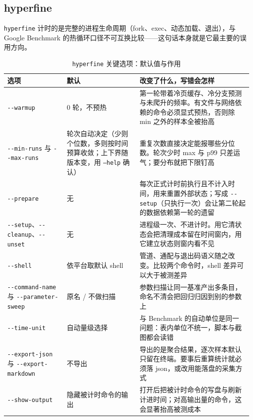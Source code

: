 \documentclass[12pt,a4paper,fontset=fandol]{ctexbook}
\newcommand{\Tp}[1]{\texttt{#1}}
\newcommand{\Opt}[1]{\texttt{-\/-#1}}
\newcommand{\Bk}{\discretionary{}{}{}}
\newcommand{\Mx}[1]{\textsf{#1}}
\begin{document}
\subsection{hyperfine}
\label{sub:pmapB-hyperfine}

\Tp{hyperfine} 计时的是完整的进程生命周期（fork、exec、动态加载、退出），与 Google Benchmark 的热循环口径不可互换比较——这句话本身就是它最主要的误用方向。

\begin{table}[htbp]
\centering
\small
\begin{tabularx}{\textwidth}{>{\raggedright\arraybackslash}p{} >{\raggedright\arraybackslash}p{} >{\raggedright\arraybackslash}X}
\toprule
选项 & 默认 & 改变了什么，写错会怎样 \\
\midrule
\Opt{warmup} & $0$ 轮，不预热 & 第一轮带着冷页缓存、冷分支预测与未爬升的频率。有文件与网络依赖的命令必须显式预热，否则除 \Mx{min} 之外的样本全被抬高 \\
\Opt{min-runs} 与 \Opt{max-runs} & 轮次自动决定（少则个位数，多则按时间预算收敛；上下界随版本变，用 \Tp{--help} 确认） & 重复次数直接决定能报哪些分位数。轮次少时 \Mx{max} 与 \Mx{p99} 只差运气；要分布就把下限钉高 \\
\Opt{prepare} & 无 & 每次正式计时前执行且不计入时间，用来重置外部状态；写成 \Opt{setup}（只执行一次）会让第二轮起的数据依赖第一轮的遗留 \\
\Opt{setup}、\Opt{cleanup}、\Opt{unset} & 无 & 进程级一次、不进计时。用它清状态会把清理成本留在时间窗内，用它建立状态则窗内看不见 \\
\Opt{shell} & 依平台取默认 shell & 管道、通配与退出码语义随之改变。比较两个命令时，shell 差异可以大于被测差异 \\
\Opt{command-{\Bk}name} 与 \Opt{parameter-{\Bk}sweep} & 原名 / 不做扫描 & 参数扫描让同一基准产出多条目，命名不清会把回归归因到别的参数上 \\
\Opt{time-unit} & 自动量级选择 & 与 Benchmark 的自动单位是同一问题：表内单位不统一，脚本与截图都会读错 \\
\Opt{export-{\Bk}json} 与 \Opt{export-{\Bk}markdown} & 不导出 & 导出的是聚合结果，逐次样本默认只留在终端。要事后重算统计就必须落 json，或改用能落盘的采集方式 \\
\Opt{show-{\Bk}output} & 隐藏被计时命令的输出 & 打开后把被计时命令的写盘与刷新计进时间；对高输出量的命令，这会显著抬高被测成本 \\
\end{tabularx}
\caption{\Tp{hyperfine} 关键选项：默认值与作用}
\label{tab:pmapB-hyperfine}
\end{table}
\end{document}
